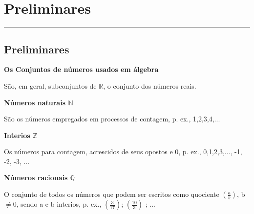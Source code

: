 \chapter{Preliminares}
\rule{14cm} {0.03cm}

\section{Preliminares}
  
  \begin{flushleft}
  
    \textbf{Os Conjuntos de números usados em álgebra}
  
      São, em geral, subconjuntos de $\mathbb{R}$, o conjunto dos números reais.

    \textbf{Números naturais $\mathbb{N}$}

      São os números empregados em processos de contagem, p. ex., 1,2,3,4,...

    \textbf{Interios $\mathbb{Z}$ }

      Os números para contagem, acrescidos de seus opostos e 0, p. ex., 0,1,2,3,..., -1, -2, -3, ...

    \textbf{Números racionais $\mathbb{Q}$}

      O conjunto de todos os números que podem ser escritos como quociente $\left (\frac{a}{b} \right) $, b $ \ne 0 $, sendo a e b interios, p. ex., $\left (\frac{3}{17} \right) $; $\left (\frac{10}{3} \right)$ ; ...
 
  \end{flushleft}
  
